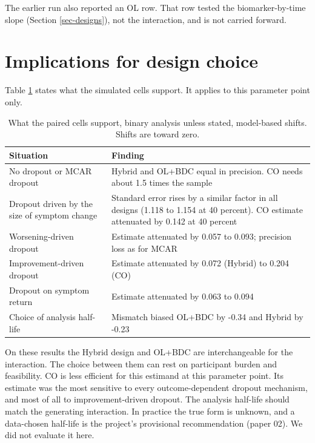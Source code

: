 \documentclass[
  11pt,
]{article}
\begin{document}
The earlier run also reported an OL row. That row tested the
biomarker-by-time slope (Section \ref{sec-designs}), not the
interaction, and is not carried forward.

\section{Implications for design choice}\label{sec-implications}

Table \ref{tab:tab-guide} states what the simulated cells support. It
applies to this parameter point only.

\begin{table}
\centering
\caption{\label{tab:tab-guide}What the paired cells support, binary analysis unless stated, model-based shifts. Shifts are toward zero.}
\centering
\fontsize{8}{10}\selectfont
\begin{tabular}[t]{>{\raggedright\arraybackslash}p{4.5cm}>{\raggedright\arraybackslash}p{8.5cm}}
\toprule
Situation & Finding\\
\midrule
No dropout or MCAR dropout & Hybrid and OL+BDC equal in precision. CO needs about 1.5 times the sample\\
Dropout driven by the size of symptom change & Standard error rises by a similar factor in all designs (1.118 to 1.154 at 40 percent). CO estimate attenuated by 0.142 at 40 percent\\
Worsening-driven dropout & Estimate attenuated by 0.057 to 0.093; precision loss as for MCAR\\
Improvement-driven dropout & Estimate attenuated by 0.072 (Hybrid) to 0.204 (CO)\\
Dropout on symptom return & Estimate attenuated by 0.063 to 0.094\\
Choice of analysis half-life & Mismatch biased OL+BDC by -0.34 and Hybrid by -0.23\\
\bottomrule
\end{tabular}
\end{table}

On these results the Hybrid design and OL+BDC are interchangeable for
the interaction. The choice between them can rest on participant burden
and feasibility. CO is less efficient for this estimand at this
parameter point. Its estimate was the most sensitive to every
outcome-dependent dropout mechanism, and most of all to
improvement-driven dropout. The analysis half-life should match the
generating interaction. In practice the true form is unknown, and a
data-chosen half-life is the project's provisional recommendation
(paper 02). We did not evaluate it here.
\end{document}
